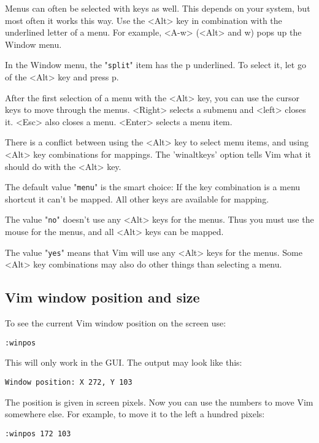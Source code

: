 Menus can often be selected with keys as well.
This depends on your system, but most often it works this way.
Use the <Alt> key in combination with the underlined letter of a menu.
For example, <A-w> (<Alt> and w) pops up the Window menu.

In the Window menu, the "\verb!split!" item has the p underlined.
To select it, let go of the <Alt> key and press p.

After the first selection of a menu with the <Alt> key, you can use the cursor keys to move through the menus.
<Right> selects a submenu and <left> closes it.
<Esc> also closes a menu.
<Enter> selects a menu item.

There is a conflict between using the <Alt> key to select menu items, and using <Alt> key combinations for mappings.
The 'winaltkeys' option tells Vim what it should do with the <Alt> key.

The default value "\verb!menu!" is the smart choice: If the key combination is a menu shortcut it can't be mapped.
All other keys are available for mapping.

The value "\verb!no!" doesn't use any <Alt> keys for the menus.
Thus you must use the mouse for the menus, and all <Alt> keys can be mapped.

The value "\verb!yes!" means that Vim will use any <Alt> keys for the menus.
Some <Alt> key combinations may also do other things than selecting a menu.
\subsection{Vim window position and size}
To see the current Vim window position on the screen use:

\begin{Verbatim}[samepage=true]
 :winpos
\end{Verbatim}

This will only work in the GUI.
The output may look like this:

\begin{Verbatim}[samepage=true]
    Window position: X 272, Y 103 
\end{Verbatim}

The position is given in screen pixels.
Now you can use the numbers to move Vim somewhere else.
For example, to move it to the left a hundred pixels:

\begin{Verbatim}[samepage=true]
 :winpos 172 103
\end{Verbatim}
 
